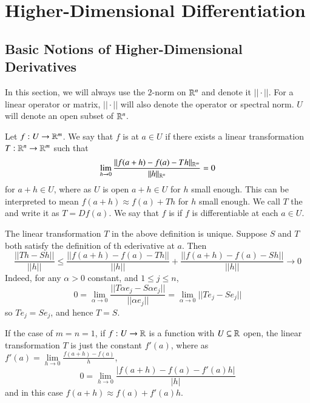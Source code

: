 \chapter{Higher-Dimensional Differentiation}
\label{HigherDiff}
\section{Basic Notions of Higher-Dimensional Derivatives}
\label{sec:basicHigherDiff}

In this section, we will always use the $2$-norm on $\mathbb R^n$ and denote it $||\cdot||$. For a linear operator or matrix, $||\cdot||$ will also denote the operator or spectral norm. $U$ will denote an open subset of $\mathbb R^n$.

\begin{definition}
    Let $f:U\rightarrow \mathbb R^m$. We say that $f$ is  at $a \in U$ if there exists a linear transformation $T:\mathbb R^n\rightarrow \mathbb R^m$ such that $$\lim\limits_{h\rightarrow 0}\frac{||f(a+h) - f(a) - Th||_{\mathbb R^m}}{||h||_{\mathbb R^n}} = 0$$ for $a+h \in U$, where as $U$ is open $a+h \in U$ for $h$ small enough. This can be interpreted to mean $f(a+h) \approx f(a)+Th$ for $h$ small enough. We call $T$ the  and write it as $T = Df(a)$. We say that $f$ is  if $f$ is differentiable at each $a \in U$.
\end{definition}

\begin{remark}
    The linear transformation $T$ in the above definition is unique. Suppose $S$ and $T$ both satisfy the definition of th ederivative at $a$. Then $$\frac{||Th - Sh||}{||h||} \leq \frac{||f(a+h) - f(a) - Th||}{||h||} + \frac{||f(a+h)-f(a)-Sh||}{||h||}\rightarrow 0$$ Indeed, for any $\alpha > 0$ constant, and $1 \leq j \leq n$, $$0 = \lim\limits_{\alpha\rightarrow 0}\frac{||T\alpha e_j - S\alpha e_j||}{||\alpha e_j||} = \lim\limits_{\alpha\rightarrow 0}||T e_j - S e_j||$$ so $T e_j = Se_j$, and hence $T = S$.
\end{remark}

If the case of $m = n =1$, if $f:U\rightarrow \mathbb R$ is a function with $U \subseteq \mathbb R$ open, the linear transformation $T$ is just the constant $f'(a)$, where as $f'(a) = \lim\limits_{h\rightarrow 0}\frac{f(a+h)-f(a)}{h}$, $$0 = \lim\limits_{h\rightarrow 0}\frac{|f(a+h) - f(a) - f'(a)h|}{|h|}$$ and in this case $f(a+h) \approx f(a) + f'(a)h$.

